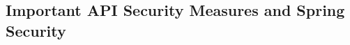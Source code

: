 \documentclass[ieeetran]{article}
\begin{document}
\subsection{Important API Security Measures and Spring Security} %
\label{sub:important_aPI_security_measures_and_spring_security}











































\end{document}
